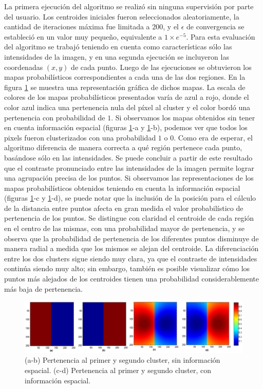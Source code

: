 La primera ejecución del algoritmo se realizó sin ninguna supervisión por parte del usuario. Los centroides iniciales fueron seleccionados aleatoriamente, la cantidad de iteraciones máxima fue limitada a 200, y el $\epsilon$ de convergencia se estableció en un valor muy pequeño, equivalente a $1 \times e^{-5}$. Para esta evaluación del algoritmo se trabajó teniendo en cuenta como características sólo las intensidades de la imagen, y en una segunda ejecución se incluyeron las coordenadas $(x,y)$ de cada punto. Luego de las ejecuciones se obtuvieron los mapas probabilísticos correspondientes a cada una de las dos regiones. En la figura \ref{fig:ejecucion1_mitad_mitad} se muestra una representación gráfica de dichos mapas. La escala de colores de los mapas probabilísticos presentados varía de azul a rojo, donde el color azul indica una pertenencia nula del píxel al cluster y el color bordó una pertenencia con probabilidad de $1$.
Si observamos los mapas obtenidos sin tener en cuenta información espacial (figuras \ref{fig:ejecucion1_mitad_mitad}-a y \ref{fig:ejecucion1_mitad_mitad}-b), podemos ver que todos los pixels fueron clusterizados con una probabilidad $1$ o $0$. Como era de esperar, el algoritmo diferencia de manera correcta a qué región pertenece cada punto, basándose sólo en las intensidades. Se puede concluir a partir de este resultado que el contraste pronunciado entre las intensidades de la imagen permite lograr una agrupación precisa de los puntos.
Si observamos las representaciones de los mapas probabilísticos obtenidos teniendo en cuenta la información espacial (figuras \ref{fig:ejecucion1_mitad_mitad}-c y \ref{fig:ejecucion1_mitad_mitad}-d), se puede notar que la inclusión de la posición para el cálculo de la distancia entre puntos afecta en gran medida el valor probabilístico de pertenencia de los puntos. Se distingue con claridad el centroide de cada región en el centro de las mismas, con una probabilidad mayor de pertenencia, y se observa que la probabilidad de pertenencia de los diferentes puntos disminuye de manera radial a medida que los mismos se alejan del centroide. La diferenciación entre los dos clusters sigue siendo muy clara, ya que el contraste de intensidades continúa siendo muy alto; sin embargo, también es posible visualizar cómo los puntos más alejados de los centroides tienen una probabilidad considerablemente más baja de pertenencia. 

\begin{figure}[H]
\centering
\includegraphics[scale=0.08]{images/mitad_mitad_001.jpg}
\caption{(a-b) Pertenencia al primer y segundo cluster, sin información espacial. (c-d) Pertenencia al primer y segundo cluster, con información espacial.}
\label{fig:ejecucion1_mitad_mitad}
\end{figure}

